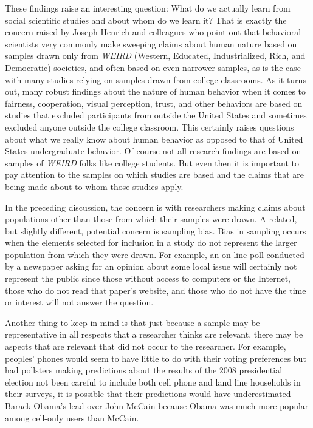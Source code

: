 These findings raise an interesting question: What do we actually learn from social scientific studies and about whom do we learn it? That is exactly the concern raised by Joseph Henrich and colleagues\cite{henrich2010most} who point out that behavioral scientists very commonly make sweeping claims about human nature based on samples drawn only from \textit{WEIRD} (Western, Educated, Industrialized, Rich, and Democratic) societies, and often based on even narrower samples, as is the case with many studies relying on samples drawn from college classrooms. As it turns out, many robust findings about the nature of human behavior when it comes to fairness, cooperation, visual perception, trust, and other behaviors are based on studies that excluded participants from outside the United States and sometimes excluded anyone outside the college classroom. This certainly raises questions about what we really know about human behavior as opposed to that of United States undergraduate behavior. Of course not all research findings are based on samples of \textit{WEIRD} folks like college students. But even then it is important to pay attention to the samples on which studies are based and the claims that are being made about to whom those studies apply.

In the preceding discussion, the concern is with researchers making claims about populations other than those from which their samples were drawn. A related, but slightly different, potential concern is sampling bias. Bias in sampling occurs when the elements selected for inclusion in a study do not represent the larger population from which they were drawn. For example, an on-line poll conducted by a newspaper asking for an opinion about some local issue will certainly not represent the public since those without access to computers or the Internet, those who do not read that paper's website, and those who do not have the time or interest will not answer the question.

Another thing to keep in mind is that just because a sample may be representative in all respects that a researcher thinks are relevant, there may be aspects that are relevant that did not occur to the researcher. For example, peoples' phones would seem to have little to do with their voting preferences but had pollsters making predictions about the results of the $ 2008 $ presidential election not been careful to include both cell phone and land line households in their surveys, it is possible that their predictions would have underestimated Barack Obama's lead over John McCain because Obama was much more popular among cell-only users than McCain\cite{keeter2008calling}.

